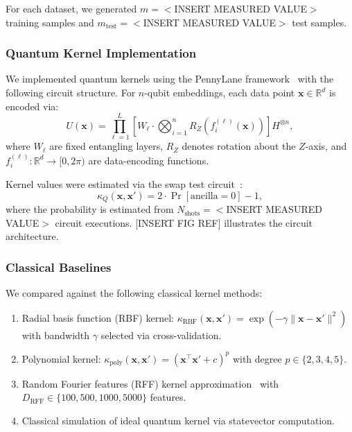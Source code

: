\documentclass[aps,prb,reprint,superscriptaddress,showpacs]{revtex4-2}
\begin{document}
For each dataset, we generated $m = <$INSERT MEASURED VALUE$>$ training samples and $m_{\text{test}} = <$INSERT MEASURED VALUE$>$ test samples.

\subsubsection{Quantum Kernel Implementation}

We implemented quantum kernels using the PennyLane framework~\cite{Bergholm2018PennyLane} with the following circuit structure. For $n$-qubit embeddings, each data point $\mathbf{x} \in \mathbb{R}^d$ is encoded via:
\begin{equation}
    U(\mathbf{x}) = \prod_{\ell=1}^{L} \left[ W_\ell \cdot \bigotimes_{i=1}^{n} R_Z(f_i^{(\ell)}(\mathbf{x})) \right] H^{\otimes n},
\end{equation}
where $W_\ell$ are fixed entangling layers, $R_Z$ denotes rotation about the $Z$-axis, and $f_i^{(\ell)}: \mathbb{R}^d \rightarrow [0, 2\pi)$ are data-encoding functions.

Kernel values were estimated via the swap test circuit~\cite{Buhrman2001QuantumFingerprinting}:
\begin{equation}
    \kappa_Q(\mathbf{x}, \mathbf{x}') = 2 \cdot \Pr[\text{ancilla} = 0] - 1,
\end{equation}
where the probability is estimated from $N_{\text{shots}} = <$INSERT MEASURED VALUE$>$ circuit executions. [INSERT FIG REF] illustrates the circuit architecture.

\subsubsection{Classical Baselines}

We compared against the following classical kernel methods:
\begin{enumerate}[label=(\roman*)]
    \item Radial basis function (RBF) kernel: $\kappa_{\text{RBF}}(\mathbf{x}, \mathbf{x}') = \exp(-\gamma \|\mathbf{x} - \mathbf{x}'\|^2)$ with bandwidth $\gamma$ selected via cross-validation.
    \item Polynomial kernel: $\kappa_{\text{poly}}(\mathbf{x}, \mathbf{x}') = (\mathbf{x}^\top \mathbf{x}' + c)^p$ with degree $p \in \{2, 3, 4, 5\}$.
    \item Random Fourier features (RFF) kernel approximation~\cite{Rahimi2007RandomFeatures} with $D_{\text{RFF}} \in \{100, 500, 1000, 5000\}$ features.
    \item Classical simulation of ideal quantum kernel via statevector computation.
\end{enumerate}
\end{document}
